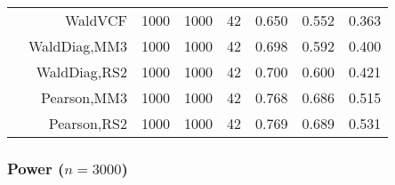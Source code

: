 \documentclass[
]{article}
\begin{document}
\begin{table}[H]
{\begin{tabular}[t]{lrrrrrrr}
\hspace{1em} & WaldVCF & 1000 & 1000 & 42 & 0.650 & 0.552 & 0.363\\

\hspace{1em} & WaldDiag,MM3 & 1000 & 1000 & 42 & 0.698 & 0.592 & 0.400\\

\hspace{1em} & WaldDiag,RS2 & 1000 & 1000 & 42 & 0.700 & 0.600 & 0.421\\

\hspace{1em} & Pearson,MM3 & 1000 & 1000 & 42 & 0.768 & 0.686 & 0.515\\

\hspace{1em} & Pearson,RS2 & 1000 & 1000 & 42 & 0.769 & 0.689 & 0.531\\
\bottomrule
\end{tabular}}
\endgroup{}
\end{table}

\hypertarget{power-n3000}{%
\subsubsection{\texorpdfstring{Power
(\(n=3000\))}{Power (n=3000)}}\label{power-n3000}}
\end{document}
